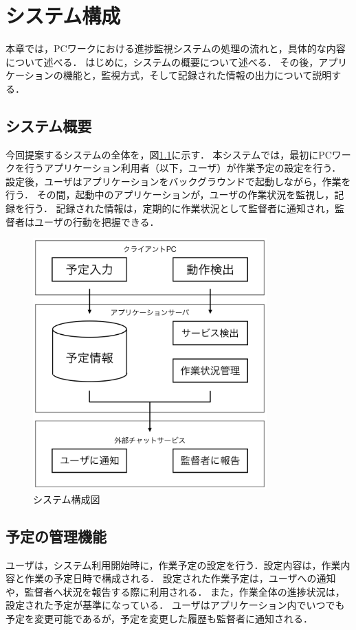 \chapter{システム構成}

本章では，PCワークにおける進捗監視システムの処理の流れと，具体的な内容について述べる．
はじめに，システムの概要について述べる．
その後，アプリケーションの機能と，監視方式，そして記録された情報の出力について説明する．

\section{システム概要}
今回提案するシステムの全体を，図\ref{fig:structure_chart}に示す．
本システムでは，最初にPCワークを行うアプリケーション利用者（以下，ユーザ）が作業予定の設定を行う．
設定後，ユーザはアプリケーションをバックグラウンドで起動しながら，作業を行う．
その間，起動中のアプリケーションが，ユーザの作業状況を監視し，記録を行う．
記録された情報は，定期的に作業状況として監督者に通知され，監督者はユーザの行動を把握できる．

\clearpage

\begin{figure}[h]
  \begin{center}
  \includegraphics[width=9.0cm]{graphics/structure_chart.png}
  \caption{システム構成図}
  \label{fig:structure_chart}
  \end{center}
\end{figure}

\section{予定の管理機能}
ユーザは，システム利用開始時に，作業予定の設定を行う．設定内容は，作業内容と作業の予定日時で構成される．
設定された作業予定は，ユーザへの通知や，監督者へ状況を報告する際に利用される．
また，作業全体の進捗状況は，設定された予定が基準になっている．
ユーザはアプリケーション内でいつでも予定を変更可能であるが，予定を変更した履歴も監督者に通知される．

